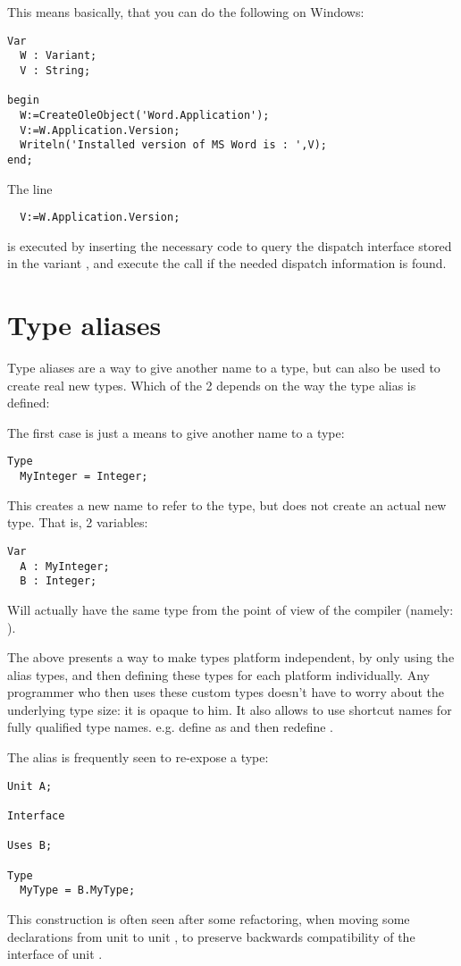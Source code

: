 This means basically, that you can do the following on Windows:
\begin{verbatim}
Var
  W : Variant;
  V : String;

begin
  W:=CreateOleObject('Word.Application');
  V:=W.Application.Version;
  Writeln('Installed version of MS Word is : ',V);
end;
\end{verbatim}
The line 
\begin{verbatim}
  V:=W.Application.Version;
\end{verbatim}
is executed by inserting the necessary code to query the dispatch interface
stored in the variant , and execute the call if the needed dispatch
information is found.

\section{Type aliases}
Type aliases are a way to give another name to a type, but can also be used
to create real new types. Which of the 2 depends on the way the type alias
is defined:

The first case is just a means to give another name to a type:
\begin{verbatim}
Type
  MyInteger = Integer;
\end{verbatim}
This creates a new name to refer to the  type, but does not create an
actual new type. That is, 2 variables:
\begin{verbatim}
Var
  A : MyInteger;
  B : Integer;
\end{verbatim}
Will actually have the same type from the point of view of the compiler
(namely: ).

The above presents a way to make types platform independent, by only using the
alias types, and then defining these types for each platform individually. 
Any programmer who then uses these custom types doesn't have to worry
about the underlying type size: it is opaque to him. It also allows to use shortcut names 
for fully qualified type names. e.g. define  as
 and then redefine .

The alias is frequently seen to re-expose a type:
\begin{verbatim}
Unit A;

Interface

Uses B;

Type
  MyType = B.MyType;
\end{verbatim}
This construction is often seen after some refactoring, when moving some
declarations from unit  to unit , to preserve backwards compatibility 
of the interface of unit .

